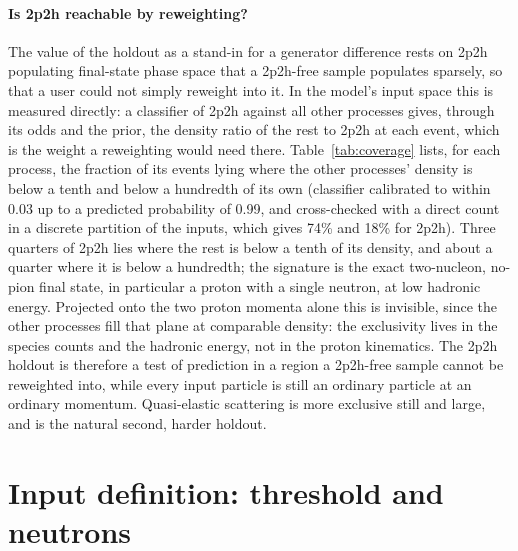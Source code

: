 \documentclass[11pt]{article}
\begin{document}
\paragraph{Is 2p2h reachable by reweighting?} The value of the holdout as a stand-in for a generator difference
rests on 2p2h populating final-state phase space that a 2p2h-free sample populates sparsely, so that a user could
not simply reweight into it. In the model's input space this is measured directly: a classifier of 2p2h against
all other processes gives, through its odds and the prior, the density ratio of the rest to 2p2h at each event,
which is the weight a reweighting would need there. Table~\ref{tab:coverage} lists, for each process, the
fraction of its events lying where the other processes' density is below a tenth and below a hundredth of its
own (classifier calibrated to within 0.03 up to a predicted probability of 0.99, and cross-checked with a direct
count in a discrete partition of the inputs, which gives 74\% and 18\% for 2p2h). Three quarters of 2p2h lies
where the rest is below a tenth of its density, and about a quarter where it is below a hundredth; the signature
is the exact two-nucleon, no-pion final state, in particular a proton with a single neutron, at low hadronic
energy. Projected onto the two proton momenta alone this is invisible, since the other processes fill that plane
at comparable density: the exclusivity lives in the species counts and the hadronic energy, not in the proton
kinematics. The 2p2h holdout is therefore a test of prediction in a region a 2p2h-free sample cannot be
reweighted into, while every input particle is still an ordinary particle at an ordinary momentum. Quasi-elastic
scattering is more exclusive still and large, and is the natural second, harder holdout.

\begin{table}[h]\centering\footnotesize

\caption{Per interaction type: share of CC $\nu_\mu$ events, classifier AUC against all other processes on the
model inputs, fraction of the process located where the other processes' density is below 0.1 and below 0.01 of
its own, and the median density ratio rest/process over the process's events.}
\label{tab:coverage}
\end{table}

\section{Input definition: threshold and neutrons}
\label{sec:inputdef}
\end{document}

